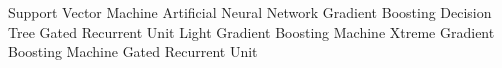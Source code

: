 \normalsize
\begin{acronym}[SCEPTICS] %
 {Support Vector Machine}
 {Artificial Neural Network}
 {Gradient Boosting Decision Tree}
 {Gated Recurrent Unit}
 {Light Gradient Boosting Machine}
 {Xtreme Gradient Boosting Machine}
 {Gated Recurrent Unit}
\end{acronym}
